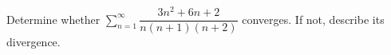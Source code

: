Determine whether $\sum_{n=1}^{\infty}\dfrac{3n^2+6n+2}{n(n+1)(n+2)}$ converges. If not, describe its divergence.
